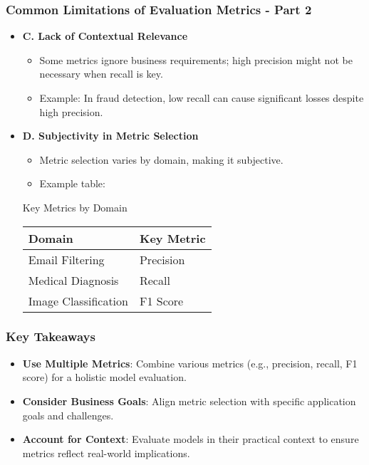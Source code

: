 \documentclass[aspectratio=169]{beamer}
\begin{document}
\begin{frame}[fragile]
    \frametitle{Common Limitations of Evaluation Metrics - Part 2}
    \begin{itemize}
        \item \textbf{C. Lack of Contextual Relevance}
        \begin{itemize}
            \item Some metrics ignore business requirements; high precision might not be necessary when recall is key.
            \item Example: In fraud detection, low recall can cause significant losses despite high precision.
        \end{itemize}

        \item \textbf{D. Subjectivity in Metric Selection}
        \begin{itemize}
            \item Metric selection varies by domain, making it subjective.
            \item Example table:
            \end{itemize}
            \begin{block}{Key Metrics by Domain}
                \begin{tabular}{|l|l|}
                    \hline
                    \textbf{Domain} & \textbf{Key Metric} \\
                    \hline
                    Email Filtering & Precision \\
                    Medical Diagnosis & Recall \\
                    Image Classification & F1 Score \\
                    \hline
                \end{tabular}
            \end{block}
    \end{itemize}
\end{frame}

\begin{frame}[fragile]
    \frametitle{Key Takeaways}
    \begin{itemize}
        \item \textbf{Use Multiple Metrics}: Combine various metrics (e.g., precision, recall, F1 score) for a holistic model evaluation.
        \item \textbf{Consider Business Goals}: Align metric selection with specific application goals and challenges.
        \item \textbf{Account for Context}: Evaluate models in their practical context to ensure metrics reflect real-world implications.
    \end{itemize}
\end{frame}
\end{document}
